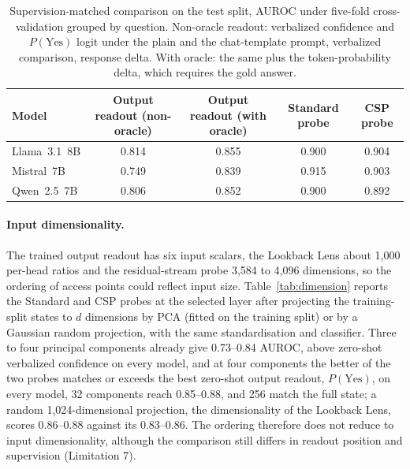 \documentclass[acmsmall,screen,review]{acmart}
\begin{document}
\begin{table}[h]
\centering
\caption{Supervision-matched comparison on the test split, AUROC under five-fold cross-validation grouped by question. Non-oracle readout: verbalized confidence and $P(\text{Yes})$ logit under the plain and the chat-template prompt, verbalized comparison, response delta. With oracle: the same plus the token-probability delta, which requires the gold answer.}
\label{tab:controls}
\small
\begin{tabular}{lcccc}
\toprule
Model & Output readout (non-oracle) & Output readout (with oracle) & Standard probe & CSP probe \\
\midrule
Llama~3.1~8B & 0.814 & 0.855 & 0.900 & 0.904 \\
Mistral~7B & 0.749 & 0.839 & 0.915 & 0.903 \\
Qwen~2.5~7B & 0.806 & 0.852 & 0.900 & 0.892 \\
\bottomrule
\end{tabular}
\end{table}

\paragraph{Input dimensionality.} The trained output readout has six input scalars, the Lookback Lens about 1,000 per-head ratios and the residual-stream probe 3,584 to 4,096 dimensions, so the ordering of access points could reflect input size. Table~\ref{tab:dimension} reports the Standard and CSP probes at the selected layer after projecting the training-split states to $d$ dimensions by PCA (fitted on the training split) or by a Gaussian random projection, with the same standardisation and classifier. Three to four principal components already give 0.73--0.84 AUROC, above zero-shot verbalized confidence on every model, and at four components the better of the two probes matches or exceeds the best zero-shot output readout, $P(\text{Yes})$, on every model, 32 components reach 0.85--0.88, and 256 match the full state; a random 1,024-dimensional projection, the dimensionality of the Lookback Lens, scores 0.86--0.88 against its 0.83--0.86. The ordering therefore does not reduce to input dimensionality, although the comparison still differs in readout position and supervision (Limitation 7).
\end{document}
